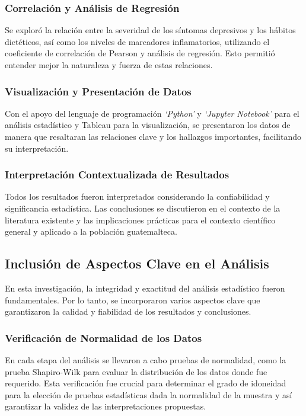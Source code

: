 \documentclass[man]{apa7}
\begin{document}
	\subsubsection{Correlación y Análisis de Regresión} Se exploró la relación
	entre la severidad de los síntomas depresivos y los hábitos dietéticos,
	así como los niveles de marcadores inflamatorios, utilizando el
	coeficiente de correlación de Pearson y análisis de regresión. Esto permitió
	entender mejor la naturaleza y fuerza de estas relaciones.

	\subsubsection{Visualización y Presentación de Datos}
	Con el apoyo del lenguaje de programación \emph{`Python'} y \emph{`Jupyter Notebook'} para el análisis estadístico y Tableau para la visualización, se presentaron los datos de manera que resaltaran las relaciones clave y los hallazgos importantes, facilitando su interpretación.

	\subsubsection{Interpretación Contextualizada de Resultados}
	Todos los resultados fueron interpretados considerando la confiabilidad y significancia estadística. Las conclusiones se discutieron en el contexto de la literatura existente y las implicaciones prácticas para el contexto científico general y aplicado a la población guatemalteca.

	\subsection{Inclusión de Aspectos Clave en el Análisis}\label{inclusiuxf3n-de-aspectos-clave-en-el-anuxe1lisis}

	En esta investigación, la integridad y exactitud del análisis
	estadístico fueron fundamentales. Por lo tanto, se incorporaron varios
	aspectos clave que garantizaron la calidad y fiabilidad de los
	resultados y conclusiones.\\

	\subsubsection{Verificación de Normalidad de los Datos}
	En cada etapa del análisis se llevaron a cabo pruebas de normalidad, como la prueba
	Shapiro-Wilk para evaluar la distribución de los datos donde fue
	requerido. Esta verificación fue crucial para determinar el grado de
	idoneidad para la elección de pruebas estadísticas dada la normalidad de la
	muestra y así garantizar la validez de las interpretaciones propuestas.
\end{document}
